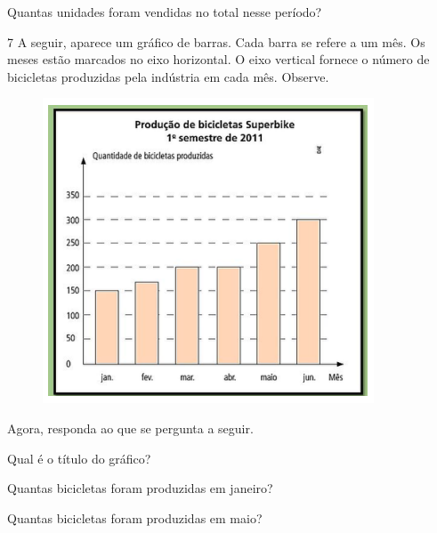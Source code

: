 {{{{\begin{escolha}

\item Quantas unidades foram vendidas no total nesse período?

\end{escolha}

\num{7} A seguir, aparece um gráfico de barras. Cada barra se refere a um mês. Os
meses estão marcados no eixo horizontal. O eixo vertical fornece o
número de bicicletas produzidas pela indústria em cada mês. Observe.

\begin{figure}[H]
\centering\includegraphics[width=3.875in,height=3.57292in]{./imgSAEB_6_MAT/media/image85.png}
\end{figure}

Agora, responda ao que se pergunta a seguir.

\begin{escolha}
\item Qual é o título do gráfico?


\item Quantas bicicletas foram produzidas em janeiro?


\item Quantas bicicletas foram produzidas em maio?


\end{escolha}}}}}

